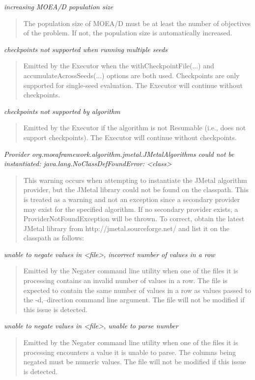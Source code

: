 \noindent
\textit{increasing MOEA/D population size}
\begin{quote}
  The population size of MOEA/D must be at least the number of objectives of the problem.  If not, the population size is automatically increased.
\end{quote}
  
\noindent
\textit{checkpoints not supported when running multiple seeds}
\begin{quote}
  Emitted by the Executor when the withCheckpointFile(...) and  accumulateAcrossSeeds(...) options are both used.  Checkpoints are only supported for single-seed evaluation.  The Executor will continue without checkpoints.
\end{quote}
  
\noindent
\textit{checkpoints not supported by algorithm}
\begin{quote}
  Emitted by the Executor if the algorithm is not Resumable (i.e., does not support checkpoints).  The Executor will continue without checkpoints.
\end{quote}
  
\noindent
\textit{Provider org.moeaframework.algorithm.jmetal.JMetalAlgorithms could not be 
instantiated: java.lang.NoClassDefFoundError: <class>}
\begin{quote}
  This warning occurs when attempting to instantiate the JMetal algorithm provider, but the JMetal library could not be found on the classpath.  This is treated as a warning and not an exception since a secondary provider may exist for the specified algorithm.  If no secondary provider exists, a ProviderNotFoundException will be thrown.  To correct, obtain the latest  JMetal library from http://jmetal.sourceforge.net/ and list it on the  classpath as follows:
\end{quote}
    
\noindent
\textit{unable to negate values in <file>, incorrect number of values in a row}
\begin{quote}
  Emitted by the Negater command line utility when one of the files it is processing contains an invalid number of values in a row.  The file is expected to contain the same number of values in a row as values passed to the -d,--direction command line argument.  The file will not be modified if this issue is detected.
\end{quote}

\noindent
\textit{unable to negate values in <file>, unable to parse number}
\begin{quote}
  Emitted by the Negater command line utility when one of the files it is processing encounters a value it is unable to parse.  The columns being negated must be numeric values.  The file will not be modified if this issue is detected.
\end{quote}